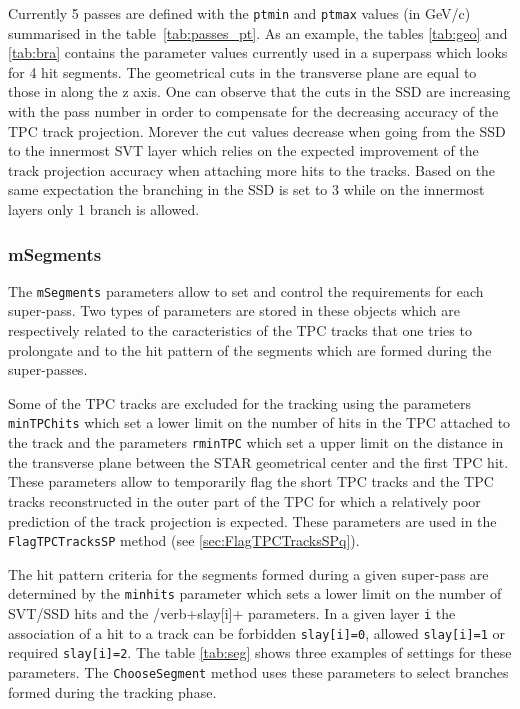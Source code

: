 \documentclass[twoside]{article}
\begin{document}
Currently 5 passes are defined with the \verb+ptmin+ and
\verb+ptmax+ values (in GeV/c) summarised in the table~\ref{tab:passes_pt}.
As an example, the tables \ref{tab:geo} and \ref{tab:bra} contains the
parameter values currently used in a superpass which looks for 4 hit
segments. The geometrical cuts in the transverse plane are equal to
those in along the z axis. One can observe that the cuts in the SSD
are increasing with the pass number in order to compensate for the
decreasing accuracy of the TPC track projection. Morever the cut
values decrease when going from the SSD to the innermost SVT layer
which relies on the expected improvement of the track projection
accuracy when attaching more hits to the tracks. Based on the same
expectation the branching in the SSD is set to 3 while on the
innermost layers only 1 branch is allowed.


\subsubsection{mSegments}
\label{sec:mSegmentsq}
The \verb+mSegments+ parameters allow to set and control the
requirements for each super-pass. Two types of parameters are stored
in these objects which are respectively related to the caracteristics
of the TPC tracks that one tries to prolongate and to the hit pattern
of the segments which are formed during the super-passes.

Some of the TPC tracks are excluded for the tracking using the
parameters \verb+minTPChits+ which set a lower limit on the number of
hits in the TPC attached to the track and the parameters
\verb+rminTPC+ which set a upper limit on the distance in the 
transverse plane between the STAR geometrical center and the first TPC
hit. These parameters allow to temporarily flag the short TPC tracks
and the TPC tracks reconstructed in the outer part of the TPC for
which a relatively poor prediction of the track projection is expected.
These parameters are used in the \verb+FlagTPCTracksSP+ method 
(see \ref{sec:FlagTPCTracksSPq}).


The hit pattern criteria for the segments formed during a given
super-pass are determined by the \verb+minhits+ parameter which sets a
lower limit on the number of SVT/SSD hits and the /verb+slay[i]+
parameters. In a given layer \verb+i+ the association of a hit to a
track can be forbidden \verb+slay[i]=0+, allowed \verb+slay[i]=1+ or
required \verb+slay[i]=2+. The table \ref{tab:seg} shows three
examples of settings for these parameters. The \verb+ChooseSegment+ 
 method uses these parameters to select
branches formed during the tracking phase.
\end{document}
